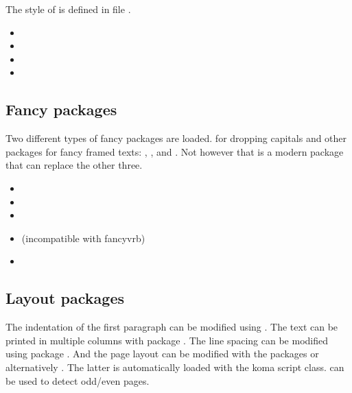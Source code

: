The style of  is defined in file .

\begin{itemize}[noitemsep]
\item {}
\item {}
\item {}
\item {}
\end{itemize}


\subsection{Fancy packages}

Two different types of fancy packages are loaded.  for dropping capitals and other packages for fancy framed texts: , ,  and . Not however that  is a modern package that can replace the other three.

\begin{itemize}[noitemsep]
\item {} 
\item {}
\item {}
\item {} (incompatible with fancyvrb)
\item {}
\end{itemize}


\subsection{Layout packages}

The indentation of the first paragraph can be modified using . The text can be printed in multiple columns with package . The line spacing can be modified using package 
. And the page layout can be modified with the packages  or alternatively . The latter is automatically loaded with the koma script class.  can be used to detect odd/even pages.


